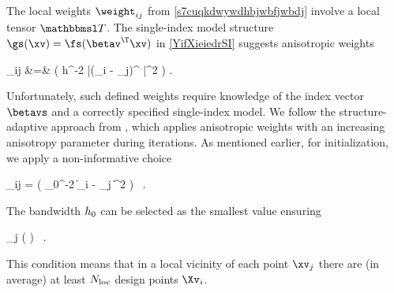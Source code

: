 The local weights \( \weight_{ij} \) from \eqref{s7cuqkdwywdhbjwbfjwbdj} involve a local tensor \( \TEDR \).
The single-index model structure \( \gs(\xv) = \fs(\betav^{\T} \xv) \) in \eqref{YifXieiedrSI} suggests
anisotropic weights
\begin{EQA}
	\weights_{ij}
	&=&
	\Kern\bigl( h^{-2} |(\Xv_{i} - \xv_{j})^{\T} \betavs|^{2} \bigr) .
\label{s7cuqkdwywdhbjwbfjwbdji}
\end{EQA}
Unfortunately, such defined weights require knowledge of the index vector \( \betavs \) and 
a correctly specified single-index model. 
We follow the structure-adaptive approach from \cite{HJPS}, which applies anisotropic weights 
with an increasing anisotropy parameter during iterations.
As mentioned earlier, for initialization, we apply a non-informative choice 
\begin{EQA}[c]
	\weight_{ij} = \Kern\bigl( \hiso_{0}^{-2} \| \Xv_{i} - \xv_{j} \|^{2} \bigr) 
	\, .
\end{EQA}
The bandwidth \( h_{0} \) can be selected as the smallest value ensuring
\begin{EQA}[c]
	\sum_{j \in \JJJ} \sumi \Kern\Bigl(  \Bigr)
	\geq 
	\nmin
	\, .
\label{jhgiverkytde4w34etycj}
\end{EQA}
This condition means that in a local vicinity of each point \( \xv_{j} \) there are (in average) 
at least \( N_{\operatorname{loc}} \) design points \( \Xv_{i} \).

